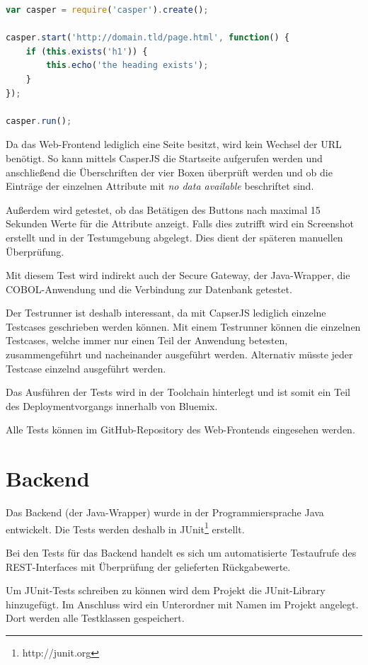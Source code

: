 \begin{lstlisting}[language=JavaScript, caption=Einfacher Test in CasperJS, label=Einfacher Test in CasperJS]
var casper = require('casper').create();

casper.start('http://domain.tld/page.html', function() {
    if (this.exists('h1')) {
        this.echo('the heading exists');
    }
});

casper.run();
\end{lstlisting}

Da das Web-Frontend lediglich eine Seite besitzt, wird kein Wechsel der URL benötigt. So kann mittels CasperJS die
Startseite aufgerufen werden und anschließend die Überschriften der vier Boxen überprüft werden und ob die Einträge
der einzelnen Attribute mit \textit{no data available} beschriftet sind.

Außerdem wird getestet, ob das Betätigen des Buttons  nach maximal 15 Sekunden Werte für die Attribute
anzeigt. Falls dies zutrifft wird ein Screenshot erstellt und in der Testumgebung abgelegt. Dies dient der späteren manuellen
Überprüfung.

Mit diesem Test wird indirekt auch der Secure Gateway, der Java-Wrapper, die COBOL-Anwendung und die Verbindung zur
Datenbank getestet.

Der Testrunner  ist deshalb interessant, da mit CapserJS lediglich einzelne Testcases geschrieben werden
können. Mit einem Testrunner können die einzelnen Testcases, welche immer nur einen Teil der Anwendung betesten,
zusammengeführt und nacheinander ausgeführt werden. Alternativ müsste jeder Testcase einzelnd ausgeführt werden.

Das Ausführen der Tests wird in der Toolchain hinterlegt und ist somit ein Teil des Deploymentvorgangs innerhalb von
Bluemix.

Alle Tests können im GitHub-Repository des Web-Frontends eingesehen werden.

\section{Backend}
Das Backend (der Java-Wrapper) wurde in der Programmiersprache Java entwickelt. Die Tests werden deshalb in
JUnit\footnote{http://junit.org} erstellt.

Bei den Tests für das Backend handelt es sich um automatisierte Testaufrufe des REST-Interfaces mit Überprüfung der
gelieferten Rückgabewerte.

Um JUnit-Tests schreiben zu können wird dem Projekt die JUnit-Library hinzugefügt. Im Anschluss wird ein Unterordner mit
Namen  im Projekt angelegt. Dort werden alle Testklassen gespeichert.


